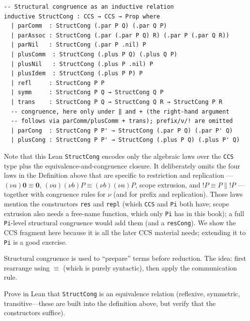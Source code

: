 \documentclass[11pt, a4paper, oneside]{book}
\newcommand{\nil}{\mathbf{0}}
\newcommand{\Par}{\mathbin{\|}}
\newcommand{\res}[1]{(\nu #1)}
\newcommand{\repl}{\mathbin{!}}
\newcommand{\lc}[1]{\texttt{#1}}
\newcounter{exercise}[chapter]
\begin{document}
\begin{leanbox}
\begin{verbatim}
-- Structural congruence as an inductive relation
inductive StructCong : CCS → CCS → Prop where
  | parComm  : StructCong (.par P Q) (.par Q P)
  | parAssoc : StructCong (.par (.par P Q) R) (.par P (.par Q R))
  | parNil   : StructCong (.par P .nil) P
  | plusComm  : StructCong (.plus P Q) (.plus Q P)
  | plusNil   : StructCong (.plus P .nil) P
  | plusIdem  : StructCong (.plus P P) P
  | refl     : StructCong P P
  | symm     : StructCong P Q → StructCong Q P
  | trans    : StructCong P Q → StructCong Q R → StructCong P R
  -- congruence, here only under ‖ and + (the right-hand argument
  -- follows via parComm/plusComm + trans); prefix/ν/! are omitted
  | parCong  : StructCong P P' → StructCong (.par P Q) (.par P' Q)
  | plusCong : StructCong P P' → StructCong (.plus P Q) (.plus P' Q)
\end{verbatim}
\end{leanbox}

Note that this Lean \lc{StructCong} encodes only the algebraic laws over the
\lc{CCS} type plus the equivalence-and-congruence closure. It deliberately
omits the four laws in the Definition above that are specific to
restriction and replication --- $\res{a}\nil \equiv \nil$,
$\res{a}\res{b}P \equiv \res{b}\res{a}P$, scope extrusion, and
$\repl P \equiv P \Par \repl P$ --- together with congruence rules for
$\nu$ (and for prefix and replication). Those laws mention the constructors \lc{res} and \lc{repl} (which
\lc{CCS} and \lc{Pi} both have; scope extrusion also needs a free-name
function, which only \lc{Pi} has in this book); a full \lc{Pi}-level structural
congruence would add them (and a \lc{resCong}). We show the CCS fragment here
because it is all the later CCS material needs; extending it to \lc{Pi} is a
good exercise.

Structural congruence is used to ``prepare'' terms before reduction. The
idea: first rearrange using $\equiv$ (which is purely syntactic), then
apply the communication rule.

\begin{exercisebox}[title={Exercise 7.1}]
Prove in Lean that \lc{StructCong} is an equivalence relation (reflexive,
symmetric, transitive---these are built into the definition above, but
verify that the constructors suffice).
\end{exercisebox}

\end{document}
